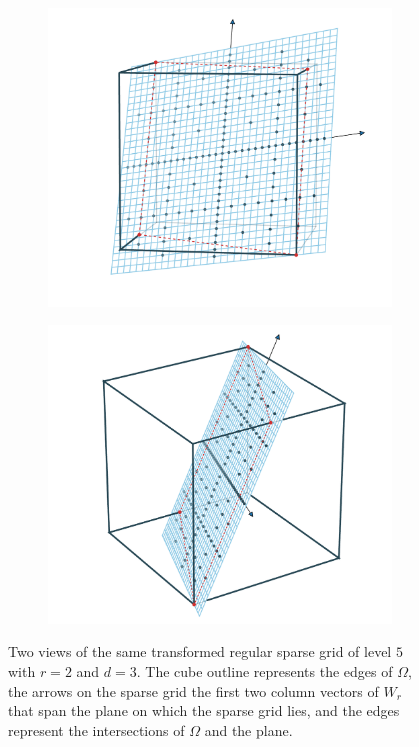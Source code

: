 \documentclass[
  a4paper,  %
  twoside,  %
  bibliography=totoc,
  headsepline,
  cleardoublepage=empty,
  parskip=half,
  draft=false
]{scrbook}
\begin{document}
\begin{mdframed}[style=style]
\vspace{2.5mm}
\begin{figure}[H]
\begin{subfigure}{.5\textwidth}
  \centering
  \includegraphics[width=\linewidth]{graphics/surrogate_vis_2}
\end{subfigure}%
\begin{subfigure}{.5\textwidth}
  \centering
  \includegraphics[width=\linewidth]{graphics/surrogate_vis_1}
\end{subfigure}
\vspace{2.5mm}
\delimit
\caption{Two views of the same transformed regular sparse grid of level $5$ with $r=2$ and $d=3$.
The \darkblue cube outline represents the edges of $\Omega$, the arrows on the sparse grid the first two column vectors of $W_r$ that span the plane on which the sparse grid lies, and the \red edges represent the intersections of $\Omega$ and the plane.}
\label{fig:trans_vis}
\end{figure}
\end{mdframed}
\end{document}
